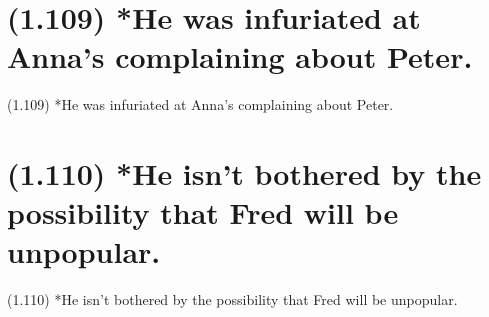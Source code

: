 \documentclass{article}
\begin{document}
\section*{(1.109) *He was infuriated at Anna's complaining about Peter.}

\bigbreak
\begin{enumerate*}
\item[(1.109)] *He was infuriated at Anna's complaining about Peter.
\end{enumerate*}
\bigbreak

\bigbreak
\begin{minipage}{\textwidth}
\end{minipage}
\bigbreak

\clearpage

%
%

\section*{(1.110) *He isn't bothered by the possibility that Fred will be unpopular.}

\bigbreak
\begin{enumerate*}
\item[(1.110)] *He isn't bothered by the possibility that Fred will be unpopular.
\end{enumerate*}
\bigbreak

\bigbreak
\begin{minipage}{\textwidth}
\end{minipage}
\bigbreak
\end{document}
